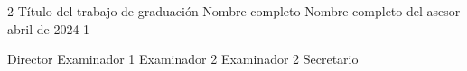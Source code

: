 \documentclass[letterpaper,12pt]{thesisECFM}
\begin{document}
	
	\datosThesis%
	{2}%
	{Título del trabajo de graduación}%
	{Nombre completo}%
	{Nombre completo del asesor}%
	{abril de 2024}		%
	{1}							%
	
	\examenPrivado%
	{Director}%
	{Examinador 1}%
	{Examinador 2}%
	{Examinador 2}%
	{Secretario}%
	{\onehalfspacing	%
		
		
		
		
		\par}
	
	\frontmatter    %
	
	{\onehalfspacing	%
		
		\tableofcontents    %
		
		
		
		
		
		\mainmatter     %
		
		
		
		
		{\backmatter     %
			
			
		}
		
		
		
		\par}               %
	
\end{document}
